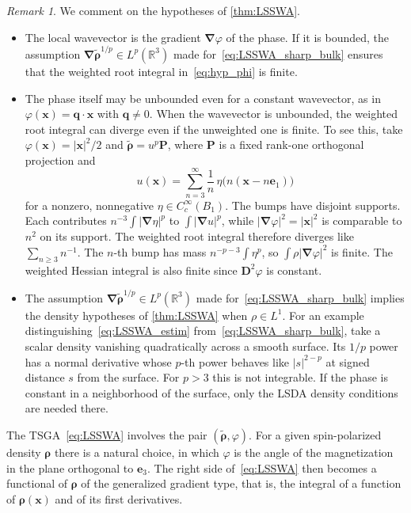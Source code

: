 \documentclass[final,reqno]{amsart}
\theoremstyle{remark}
\newtheorem{remark}{Remark}
\renewcommand{\ge}{\geqslant}
\newcommand{\wt}[1]{\widetilde{#1}}
\newcommand{\RR}{\mathbb{R}}
\newcommand{\grad}{\bm{\nabla}}
\begin{document}
\begin{remark}\label{rmk:hypotheses_TSGA}
We comment on the hypotheses of \cref{thm:LSSWA}.
\begin{itemize}
\item[(i)] The local wavevector is the gradient $\grad\varphi$ of the phase. If it is bounded, the assumption $\grad\wt{\bm{\rho}}^{1/p}\in L^p(\RR^3)$ made for~\cref{eq:LSSWA_sharp_bulk} ensures that the weighted root integral in~\cref{eq:hyp_phi} is finite.
\item[(ii)] The phase itself may be unbounded even for a constant wavevector, as in $\varphi(\mathbf{x})=\mathbf{q}\cdot\mathbf{x}$ with $\mathbf{q}\ne0$. When the wavevector is unbounded, the weighted root integral can diverge even if the unweighted one is finite. To see this, take $\varphi(\mathbf{x})=|\mathbf{x}|^2/2$ and $\wt{\bm{\rho}}=u^p\mathbf{P}$, where $\mathbf{P}$ is a fixed rank-one orthogonal projection and
\[
u(\mathbf{x})=\sum_{n=3}^{\infty}\frac{1}{n}\,\eta\big(n(\mathbf{x}-n\mathbf{e}_1)\big)
\]
for a nonzero, nonnegative $\eta\in C_c^\infty(B_1)$. The bumps have disjoint supports. Each contributes $n^{-3}\int|\grad\eta|^p$ to $\int|\grad u|^p$, while $|\grad\varphi|^2=|\mathbf{x}|^2$ is comparable to $n^2$ on its support. The weighted root integral therefore diverges like $\sum_{n\ge3}n^{-1}$. The $n$-th bump has mass $n^{-p-3}\int\eta^p$, so $\int\rho|\grad\varphi|^2$ is finite. The weighted Hessian integral is also finite since $\mathbf{D}^2\varphi$ is constant.
\item[(iii)] The assumption $\grad\wt{\bm{\rho}}^{1/p}\in L^p(\RR^3)$ made for~\cref{eq:LSSWA_sharp_bulk} implies the density hypotheses of \cref{thm:LSSWA} when $\rho\in L^1$. For an example distinguishing~\cref{eq:LSSWA_estim} from~\cref{eq:LSSWA_sharp_bulk}, take a scalar density vanishing quadratically across a smooth surface. Its $1/p$ power has a normal derivative whose $p$-th power behaves like $|s|^{2-p}$ at signed distance $s$ from the surface. For $p>3$ this is not integrable. If the phase is constant in a neighborhood of the surface, only the LSDA density conditions are needed there.
\end{itemize}
\end{remark}

The TSGA~\cref{eq:LSSWA} involves the pair $(\wt{\bm{\rho}},\varphi)$. For a given spin-polarized density $\bm{\rho}$ there is a natural choice, in which $\varphi$ is the angle of the magnetization in the plane orthogonal to $\mathbf{e}_3$. The right side of~\cref{eq:LSSWA} then becomes a functional of $\bm{\rho}$ of the generalized gradient type, that is, the integral of a function of $\bm{\rho}(\mathbf{x})$ and of its first derivatives.
\end{document}
